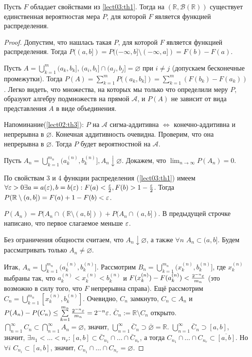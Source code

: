 	\begin{theorem}\label{lect03:th2}
	    Пусть $F$ обладает свойствами из \ref{lect03:th1}. Тогда на $(\mathbb{R},\mathcal{B}(\mathbb{R}))$ существует единственная вероятностая мера $P$, для которой $F$ является функцией распределения.
	\end{theorem}
	\begin{proof}
	    Допустим, что нашлась такая $P$, для которой $F$ является функцией распределения. Тогда $P((a,b])=P((-\infty,b]\setminus (-\infty,a]) = F(b)-F(a)$.

	    Пусть $A=\bigcup\limits_{k=1}^{m} (a_k,b_k]$, $(a_i,b_i]\cap (a_j,b_j] = \varnothing$ при $i\neq j$ (допускаем бесконечные промежутки). Тогда $P(A)=\sum\limits_{k=1}^{m} P((a_k,b_k]) = \sum\limits_{k=1}^{m}(F(b_k)-F(a_k))$. Легко видеть, что множества, на которых мы только что определили меру $P$, образуют алгебру подмножеств на прямой $\mathcal{A}$, и $P(A)$ не зависит от вида представления $A$ в виде объединения. 
	    
	    Напоминание(\ref{lect02:th3}): $P$ на $\mathcal{A}$ сигма-аддитивна $\iff$ конечно-аддитивна и непрерывна в $\varnothing$. Конечная аддитивность очевидна. Проверим, что она непрерывна в $\varnothing$. Тогда $P$ будет вероятностной на $\mathcal{A}$.
	    
	    Пусть $A_n = \bigcup\limits_{k=1}^{m_n} (a_k^{(n)},b_k^{(n)}], A_n\downarrow\varnothing$. Докажем, что $\lim_{n\to\infty}P(A_n) = 0$.
	    
	    По свойствам 3 и 4 функции распределения (\ref{lect03:th1}) имеем $\forall\varepsilon>0 \\ \exists a=a(\varepsilon), b=b(\varepsilon): F(a)<\frac{\varepsilon}{2}, F(b)>1-\frac{\varepsilon}{2}$. Тогда $P(\mathbb{R}\setminus (a,b]) = F(a)+1-F(b)<\varepsilon$.
	    
	    $P(A_n) = P(A_n \cap (\mathbb{R} \setminus (a,b])) + P(A_n \cap (a,b])$. В предыдущей строчке написано, что первое слагаемое меньше $\varepsilon$.
	    
	    Без ограничения общности считаем, что $A_n\downarrow\varnothing$, а также $\forall n$ $A_n\subset (a,b]$. Будем рассматривать только $A_n\neq\varnothing$.
	    
	    Итак, $A_n = \bigcup\limits_{k=1}^{m_n} (a_k^{(n)},b_k^{(n)}]$. Рассмотрим $B_n = \bigcup\limits_{k=1}^{m_n} (x_k^{(n)},b_k^{(n)}]$, где $x_k^{(n)}$ выбраны так, что $a_k^{(n)}<x_k^{(n)}<b_k^{(n)}$ и $F(x_k^{(n)})-F(a_k^{(n)})<\frac{2^{-n}\varepsilon}{m_n}$ (это возможно в силу того, что $F$ непрерывна справа). Ещё рассмотрим $C_n = \bigcup\limits_{k=1}^{m_n} [x_k^{(n)},b_k^{(n)}]$. Очевидно, $C_n$ замкнуто, $C_n\subset A_n$ и $P(A_n)-P(C_n)\le \sum\limits_{k=1}^{m_n} \frac{2^{-n}\varepsilon}{m_n} = 2^{-n}\varepsilon$. $ \bar C_n := \mathbb{R}\setminus C_n$ открыто. $\bigcap\limits_{n=1}^{\infty} C_n \subset \bigcap\limits_{n=1}^{\infty} A_n = \varnothing$, значит, $\bigcup\limits_{n=1}^{\infty} \bar C_n \supset \bar \varnothing = \mathbb{R}$. $\bigcup\limits_{n=1}^{\infty} \bar C_n \supset [a,b]$, значит, $\exists n_1<\ldots<n_r: [a,b] \subset \bar C_{n_1} \cap \ldots \cap \bar C_{n_r}$, а тогда $ C_{n_1} \cap \ldots \cap C_{n_r} \subset \overline{[a,b]}$. Но $\forall i$ $C_{n_i}\subset [a,b]$, значит, $C_{n_1} \cap \ldots \cap C_{n_r} = \varnothing$. 
	    

\end{proof}
